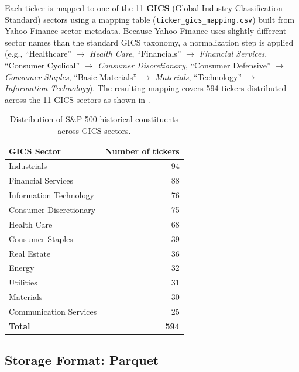 Each ticker is mapped to one of the 11 \textbf{GICS} (Global Industry
Classification Standard) sectors using a mapping table
(\texttt{ticker\_gics\_mapping.csv}) built from Yahoo Finance sector
metadata. Because Yahoo Finance uses slightly different sector names than
the standard GICS taxonomy, a normalization step is applied (e.g.,
``Healthcare'' $\to$ \emph{Health Care}, ``Financials'' $\to$
\emph{Financial Services}, ``Consumer Cyclical'' $\to$ \emph{Consumer
Discretionary}, ``Consumer Defensive'' $\to$ \emph{Consumer Staples},
``Basic Materials'' $\to$ \emph{Materials}, ``Technology'' $\to$
\emph{Information Technology}). The resulting mapping covers 594 tickers
distributed across the 11 GICS sectors as shown in
.

\begin{table}[H]
\centering
\caption{Distribution of S\&P 500 historical constituents across GICS sectors.}
\label{tab:gics-distribution}
\begin{tabular}{lr}
\toprule
\textbf{GICS Sector} & \textbf{Number of tickers} \\
\midrule
Industrials              & 94 \\
Financial Services       & 88 \\
Information Technology   & 76 \\
Consumer Discretionary   & 75 \\
Health Care              & 68 \\
Consumer Staples         & 39 \\
Real Estate              & 36 \\
Energy                   & 32 \\
Utilities                & 31 \\
Materials                & 30 \\
Communication Services   & 25 \\
\midrule
\textbf{Total}           & \textbf{594} \\
\bottomrule
\end{tabular}
\end{table}

\subsection{Storage Format: Parquet}
\label{sec:meth-parquet}

